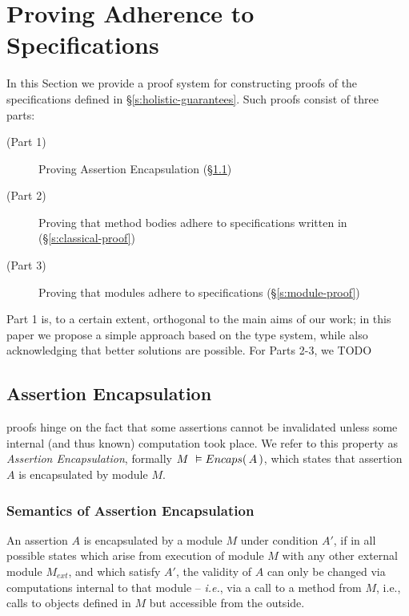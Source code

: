 \section{Proving Adherence to \SpecLang Specifications}
\label{s:inference}

In this Section we provide a proof system for constructing 
proofs of the \SpecLang specifications defined in \S \ref{s:holistic-guarantees}.
Such proofs consist of 
 three parts: %
\begin{description} 
\item[(Part 1)]
Proving Assertion Encapsulation (\S \ref{s:encaps-proof})
\item[(Part 2)]
Proving that   method bodies adhere to specifications written in \AssertLang (\S \ref{s:classical-proof})
\item[(Part 3)]
Proving that modules adhere to \SpecLang specifications (\S \ref{s:module-proof})
\end{description}

Part 1 is, to a certain extent, orthogonal to the main aims of our work;
in this paper we propose a simple approach based on the type system, while also acknowledging that 
better solutions are possible.
For Parts 2-3, we 
TODO


\subsection {Assertion Encapsulation}
\label{s:encaps-proof}

{
{\SpecLang proofs  hinge on the fact that some assertions cannot be invalidated unless some 
} internal (and thus known)
computation took place. 
{We refer to this property as \emph{Assertion Encapsulation},}
}
formally $M\ \vDash  {\ensuremath Encaps(\, A\, )}$, which states that 
 assertion $A$ is encapsulated by module $M$.


\subsubsection{Semantics of Assertion Encapsulation}

{An assertion $A$  is  encapsulated by a module $M$ under condition $A'$,
if in all possible states which arise from execution of module $M$ with any other external module $M_{ext}$, and which satisfy $A'$, 
the validity of $A$} 
{ can only be changed via computations internal to that module} -- \emph{i.e.},  via a call to
a method from $M$, i.e.,
calls to objects defined in $M$ but accessible from the
outside.


